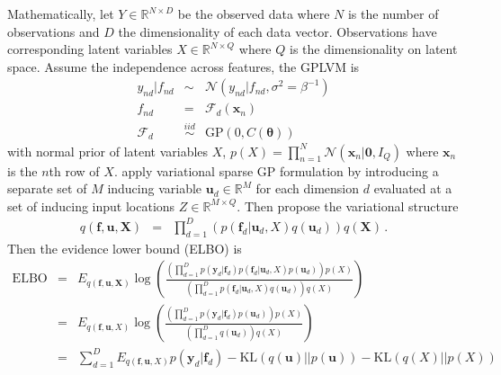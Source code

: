 \documentclass{article}
\begin{document}
Mathematically, let $Y \in \mathbb{R}^{N\times D}$ be the observed data where $N$ is the number of observations and $D$ the dimensionality of each data vector. Observations have corresponding latent variables $X \in \mathbb{R}^{N \times Q}$ where $Q$ is the dimensionality on latent space. Assume the independence across features, the GPLVM is 
\begin{eqnarray}
y_{nd}|f_{nd} & \sim & \mathcal{N}(y_{nd}|f_{nd}, \sigma^2 = \beta^{-1}) \nonumber \\
f_{nd} & = & \mathcal{F}_d(\bm x_n) \nonumber \\
\mathcal{F}_d & \stackrel{iid}{\sim} & \mathrm{GP}(0, C(\bm\theta)) \nonumber 
\end{eqnarray}
with normal prior of latent variables $X$, $
p(X) = \prod_{n = 1}^{N}\mathcal{N}(\bm x_n|\bm 0, I_Q)$
where $\bm x_n$ is the $n$th row of $X$. \cite{Titsias_2009, Titsias_2010} apply variational sparse GP formulation by introducing a separate set of $M$ inducing variable $\bm u_d \in \mathbb{R}^M$ for each dimension $d$ evaluated at a set of inducing input locations $Z\in\mathbb{R}^{M\times Q}$. Then \cite{Titsias_2010, Hensman_2013} propose the variational structure 
\begin{eqnarray}
	q(\bm f, \bm u, \bm X) & = & \prod_{d = 1}^D\left(p(\bm f_d| \bm u_d, X) q(\bm u_d)\right) q(\bm X)\,.
\end{eqnarray}
Then the evidence lower bound (ELBO) is 
\begin{eqnarray}
\mathrm{ELBO} & = & E_{q(\bm f, \bm u, \bm X)} \log\left(\frac{\left(\prod_{d = 1}^{D}p(\bm y_d|\bm f_d)p(\bm f_d| \bm u_d, X)p(\bm u_d)\right)p(X)}{\left(\prod_{d = 1}^Dp(\bm f_d| \bm u_d, X) q(\bm u_d)\right) q(X)}\right) \nonumber \\
& = & E_{q(\bm f, \bm u, X)} \log\left(\frac{\left(\prod_{d = 1}^{D}p(\bm y_d|\bm f_d)p(\bm u_d)\right)p(X)}{\left(\prod_{d = 1}^D q(\bm u_d)\right) q(X)}\right) \nonumber \\
& = & \sum_{d = 1}^{D}E_{q(\bm f, \bm u, X)}p(\bm y_d|\bm f_d) - \mathrm{KL}(q(\bm u)||p(\bm u)) - \mathrm{KL}(q(X)||p(X)) 
\end{eqnarray}	
\end{document}
